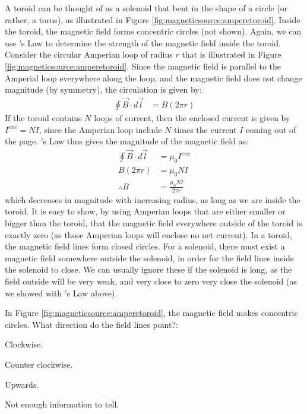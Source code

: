 A toroid can be thought of as a solenoid that bent in the shape of a circle (or rather, a torus), as illustrated in Figure \ref{fig:magneticsource:amperetoroid}. Inside the toroid, the magnetic field forms concentric circles (not shown). 
Again, we can use \ampere's Law to determine the strength of the magnetic field inside the toroid. Consider the circular Amperian loop of radius $r$ that is illustrated in Figure \ref{fig:magneticsource:amperetoroid}. Since the magnetic field is parallel to the Amperial loop everywhere along the loop, and the magnetic field does not change magnitude (by symmetry), the circulation is given by:
\begin{align*}
\oint \vec B \cdot d\vec l &= B (2\pi r)
\end{align*}
If the toroid contains $N$ loops of current, then the enclosed current is given by $I^{enc}=NI$, since the Amperian loop include $N$ times the current $I$ coming out of the page. \ampere's Law thus gives the magnitude of the magnetic field as:
\begin{align*}
\oint \vec B \cdot d\vec l &=\mu_0 I^{enc}\\
B (2\pi r) &= \mu_0 NI\\
\therefore B&=\frac{\mu_0 NI}{2\pi r}
\end{align*}
which decreases in magnitude with increasing radius, as long as we are inside the toroid. It is easy to show, by using Amperian loops that are either smaller or bigger than the toroid, that the magnetic field everywhere outside of the toroid is exactly zero (as those Amperian loops will enclose no net current). In a toroid, the magnetic field lines form closed circles. For a solenoid, there must exist a magnetic field somewhere outside the solenoid, in order for the field lines inside the solenoid to close. We can usually ignore these if the solenoid is long, as the field outside will be very weak, and very close to zero very close the solenoid (as we showed with \ampere's Law above). 

\begin{checkpoint}{}
	\begin{MCquestion}{In Figure \ref{fig:magneticsource:amperetoroid}, the magnetic field makes concentric circles. What direction do the field lines point?:}
		\item Clockwise.
		\item Counter clockwise. \correct
		\item Upwards.
		\item Not enough information to tell.
	\end{MCquestion}
\end{checkpoint}

